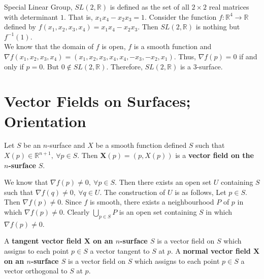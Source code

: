 \begin{enumerate}
\begin{important}
	Special Linear Group, $SL(2,\mathbb{R})$ is defined as the set of all $2 \times 2$ real matrices with determinant $1$. That is, $x_1x_4 - x_2x_3 = 1$. Consider the function $f : \mathbb{R}^4 \to \mathbb{R}$ defined by $f(x_1,x_2,x_3,x_4) = x_1x_4 - x_2x_3$. Then $SL(2,\mathbb{R})$ is nothing but $f^{-1}(1)$.\\

	We know that the domain of $f$ is open, $f$ is a smooth function and $\nabla f(x_1,x_2,x_3,x_4) = (x_1,x_2,x_3,x_4,x_4,-x_3,-x_2,x_1)$.
	Thus, $\nabla f(p) = 0$ if and only if $p = 0$. But $0 \notin SL(2,\mathbb{R})$. Therefore, $SL(2,\mathbb{R})$ is a $3$-surface.
\end{important}
\end{enumerate}

\section{Vector Fields on Surfaces; Orientation}
\begin{definition}
	Let $S$ be an $n$-surface and $X$ be a smooth function defined $S$ such that $X(p) \in \mathbb{R}^{n+1},\ \forall p \in S$.
	Then $\boldsymbol{X}(p) = (p,X(p))$ is a \textbf{vector field on the $n$-surface} $S$.
\end{definition}
\begin{commentary}
	We know that $\nabla f(p) \ne 0,\ \forall p \in S$. Then there exists an open set $U$ containing $S$ such that $\nabla f(q) \ne 0,\ \forall q \in U$. The construction of $U$ is as follows, Let $p \in S$. Then $\nabla f(p) \ne 0$. Since $f$ is smooth, there exists a neighbourhood $P$ of $p$ in which $\nabla f(p) \ne 0$. Clearly $\displaystyle \bigcup_{p \in S} P$ is an open set containing $S$ in which $\nabla f(p) \ne 0$.
\end{commentary}

\begin{definition}
	A \textbf{tangent vector field $\boldsymbol{X}$ on an $n$-surface $S$} is a vector field on $S$ which assigns to each point $p \in S$ a vector tangent to $S$ at $p$.
	A \textbf{normal vector field $\boldsymbol{X}$ on an $n$-surface $S$} is a vector field on $S$ which assigns to each point $p \in S$ a vector orthogonal to $S$ at $p$.
\end{definition}

